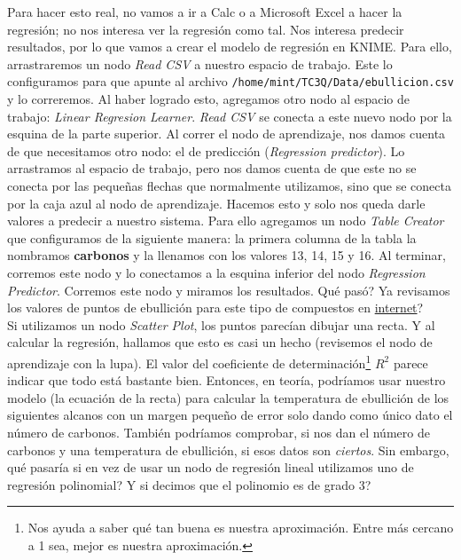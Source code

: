 \documentclass[10pt,letterpaper]{article}
\newcommand{\inlinecode}[1]{
\colorbox{light-gray}{\texttt{#1}}
}
\begin{document}
Para hacer esto real, no vamos a ir a Calc o a Microsoft Excel a hacer la regresi\'on; no nos interesa ver la regresi\'on como tal. Nos interesa predecir resultados, por lo que vamos a crear el modelo de regresi\'on en KNIME. Para ello, arrastraremos un nodo \textit{Read CSV} a nuestro espacio de trabajo. Este lo configuramos para que apunte al archivo \inlinecode{/home/mint/TC3Q/Data/ebullicion.csv} y lo correremos. Al haber logrado esto, agregamos otro nodo al espacio de trabajo: \textit{Linear Regresion Learner}. \textit{Read CSV} se conecta a este nuevo nodo por la esquina de la parte superior. Al correr el nodo de aprendizaje, nos damos cuenta de que necesitamos otro nodo: el de predicci\'on (\textit{Regression predictor}). Lo arrastramos al espacio de trabajo, pero nos damos cuenta de que este no se conecta por las peque\~nas flechas que normalmente utilizamos, sino que se conecta por la caja azul al nodo de aprendizaje. Hacemos esto y solo nos queda darle valores a predecir a nuestro sistema. Para ello agregamos un nodo \textit{Table Creator} que configuramos de la siguiente manera: la primera columna de la tabla la nombramos \textbf{carbonos} y la llenamos con los valores 13, 14, 15 y 16. Al terminar, corremos este nodo y lo conectamos a la esquina inferior del nodo \textit{Regression Predictor}. Corremos este nodo y miramos los resultados. Qu\'e pas\'o? Ya revisamos los valores de puntos de ebullici\'on para este tipo de compuestos en \href{http://www.chemspider.com/}{internet}?\\

Si utilizamos un nodo \textit{Scatter Plot}, los puntos parec\'ian dibujar una recta. Y al calcular la regresi\'on, hallamos que esto es casi un hecho (revisemos el nodo de aprendizaje con la lupa). El valor del coeficiente de determinaci\'on\footnote{Nos ayuda a saber qu\'e tan buena es nuestra aproximaci\'on. Entre m\'as cercano a 1 sea, mejor es nuestra aproximaci\'on.} $R^2$ parece indicar que todo est\'a bastante bien. Entonces, en teor\'ia, podr\'iamos usar nuestro modelo (la ecuaci\'on de la recta) para calcular la temperatura de ebullici\'on de los siguientes alcanos con un margen peque\~no de error solo dando como \'unico dato el n\'umero de carbonos. Tambi\'en podr\'iamos comprobar, si nos dan el n\'umero de carbonos y una temperatura de ebullici\'on, si esos datos son \textit{ciertos}. Sin embargo, qu\'e pasar\'ia si en vez de usar un nodo de regresi\'on lineal utilizamos uno de regresi\'on polinomial? Y si decimos que el polinomio es de grado 3?\\
\end{document}
